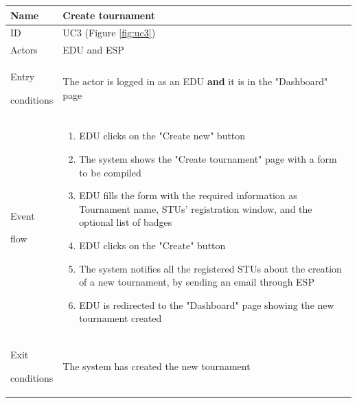 \begin{center}
    \def\arraystretch{1.5}
    \begin{tabular}{| m{2cm} | m{10cm}|}
        \hline
        Name                  & Create tournament                                                                                                                       \\ \hline
        ID                    & UC3 (Figure \ref{fig:uc3})                                                                                                              \\ \hline
        Actors                & EDU and ESP                                                                                                                             \\ \hline
        Entry \par conditions & The actor is logged in as an EDU \textbf{and} it is in the "Dashboard" page                                                             \\ \hline
        Event \par flow       & \begin{enumerate}
                                    \item EDU clicks on the "Create new" button
                                    \item The system shows the "Create tournament" page with a form to be compiled
                                    \item EDU fills the form with the required information as Tournament name, STUs' registration window, and the optional list of badges
                                    \item EDU clicks on the "Create" button
                                    \item The system notifies all the registered STUs about the creation of a new tournament, by sending an email through ESP
                                    \item EDU is redirected to the "Dashboard" page showing the new tournament created
                                \end{enumerate}                                                                                                                         \\ \hline
        Exit \par conditions  & The system has created the new tournament                                                                                               \\ \hline

\end{tabular}
\end{center}
